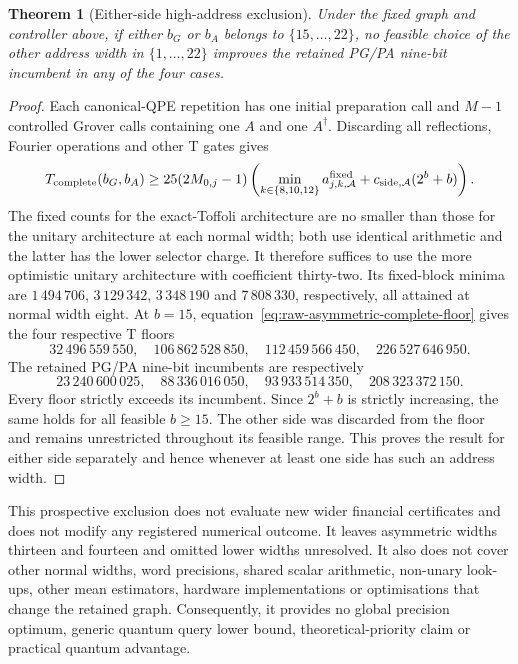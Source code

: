\documentclass[11pt]{article}
\newtheorem{theorem}{Theorem}
\begin{document}
\begin{theorem}[Either-side high-address exclusion]
\label{thm:raw-asymmetric-high-width-exclusion}
Under the fixed graph and controller above, if either $b_G$ or $b_A$
belongs to $\{15,\ldots,22\}$, no feasible choice of the other
address width in $\{1,\ldots,22\}$ improves the retained PG/PA
nine-bit incumbent in any of the four cases.
\end{theorem}
\begin{proof}
Each canonical-QPE repetition has one initial preparation call and
$M-1$ controlled Grover calls containing one $A$ and one
$A^\dagger$. Discarding all reflections, Fourier operations and
other T gates gives
\begin{equation}
 T_{\rm complete}(b_G,b_A)
 \geq25(2M_{0,j}-1)
    \left(\min_{k\in\{8,10,12\}}a^{\rm fixed}_{j,k,\mathcal A}
           +c_{\rm side,\mathcal A}(2^b+b)\right).
\label{eq:raw-asymmetric-complete-floor}
\end{equation}
The fixed counts for the exact-Toffoli architecture are no smaller
than those for the unitary architecture at each normal width; both
use identical arithmetic and the latter has the lower selector charge.
It therefore suffices to use the more optimistic unitary architecture
with coefficient thirty-two. Its fixed-block minima are
$1\,494\,706$, $3\,129\,342$, $3\,348\,190$ and
$7\,808\,330$, respectively, all attained at normal width eight.
At $b=15$, equation~\eqref{eq:raw-asymmetric-complete-floor} gives
the four respective T floors
\begin{equation}
 32\,496\,559\,550,\quad106\,862\,528\,850,\quad
 112\,459\,566\,450,\quad226\,527\,646\,950.
\end{equation}
The retained PG/PA nine-bit incumbents are respectively
\begin{equation}
 23\,240\,600\,025,\quad88\,336\,016\,050,\quad
 93\,933\,514\,350,\quad208\,323\,372\,150.
\end{equation}
Every floor strictly exceeds its incumbent. Since $2^b+b$ is strictly
increasing, the same holds for all feasible $b\geq15$. The other
side was discarded from the floor and remains unrestricted throughout
its feasible range. This proves the result for either side separately
and hence whenever at least one side has such an address width.
\end{proof}

This prospective exclusion does not evaluate new wider financial
certificates and does not modify any registered numerical outcome.
It leaves asymmetric widths thirteen and fourteen and omitted lower
widths unresolved. It also does not cover other normal widths,
word precisions, shared scalar arithmetic, non-unary look-ups, other
mean estimators, hardware implementations or optimisations that change
the retained graph. Consequently, it provides no global precision
optimum, generic quantum query lower bound, theoretical-priority claim
or practical quantum advantage.
\end{document}
